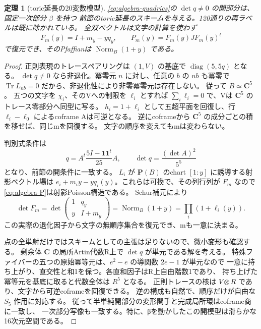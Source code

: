 \documentclass[11pt,a4paper]{ltjsarticle}
\newcommand{\CC}{\mathbf C}
\newcommand{\PP}{\mathbf P}
\newtheorem{theorem}{定理}[section]
\theoremstyle{remark}
\begin{document}
\begin{theorem}[toric延長の20変数模型]\label{thm:algebra-model}
\eqref{eq:algebra-quadrics}の $\det q\ne0$ の開部分は、固定一次部分 $\beta$ を持つ
前節のtoric延長のスキームを与える。120通りの再ラベルは既に除かれている。
全双ベクトルは文字の計算を使わず
\begin{equation}\label{eq:algebra-P}
 F_m(y)=I+m_y-yq_y,\qquad P_m(y)=F_m(y)JF_m(y)^t
\end{equation}
で復元でき、そのPfaffianは $\operatorname{Norm}_B(1+y)$ である。
\end{theorem}
\begin{proof}
正則表現のトレースペアリングは $(1,V)$ の基底で $\operatorname{diag}(5,5q)$ となる。
$\det q\ne0$ なら非退化。冪零元 $n$ に対し、任意の $b$ の $nb$ も冪零で
$\operatorname{Tr}L_{nb}=0$ だから、非退化性により非零冪零元は存在しない。
従って $B\simeq\CC^5$。
五つの文字を $\chi_i$、そのVへの制限を $\ell_i$ とすれば
$\sum_i\ell_i=0$ で、Vは $\CC^5$ のトレース零部分へ同型に写る。
$h_i=1+\ell_i$ として五超平面を回復し、行 $\ell_i-\ell_0$ によるcoframe Aは可逆となる。
逆にcoframeから $\CC^5$ の成分ごとの積を移せば、同じmを回復する。
文字の順序を変えてもmは変わらない。

判別式条件は
\[
 q=A^t\frac{5I-\mathbf1\mathbf1^t}{25}A,\qquad
 \det q=\frac{(\det A)^2}{5^5}
\]
となり、前節の開条件に一致する。
$L_i$ が $\PP(B)$ のchart $[1:y]$ に誘導する射影ベクトル場は
$e_i+m_i y-yq_i(y)$。これらは可換で、その列行列が $F_m$ なので
\eqref{eq:algebra-P}は射影Poisson構造である。
Schur補元により
\[
 \det F_m=\det\begin{pmatrix}1&q_y\\y&I+m_y\end{pmatrix}
           =\operatorname{Norm}_B(1+y)=\prod_i(1+\ell_i(y)).
\]
この実際の退化因子から文字の無順序集合を復元でき、mも一意に決まる。

点の全単射だけではスキームとしての主張は足りないので、微小変形も確認する。
剰余体 $\CC$ の局所Artin代数R上で $\det q$ が単元である解を考える。
特殊ファイバーの五つの原始冪等元は、$e^2-e$ の導関数 $2e-1$ が単元なので
一意に持ち上がり、直交性と和1を保つ。各直和因子はR上自由階数1であり、
持ち上げた冪等元を基底に取ると代数全体は $R^5$ となる。
正則トレースの核は $V\otimes R$ であり、文字から可逆coframeを回復できる。
逆の構成も自然で、順序だけが自由な $S_5$ 作用に対応する。
従って半単純開部分の変形関手と完成局所環はcoframe商に一致し、
一次部分写像も一致する。特に、βを動かしたこの開模型は滑らかな16次元空間である。
\end{proof}
\end{document}

